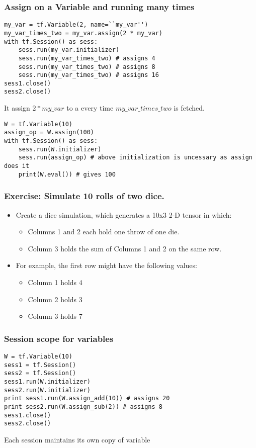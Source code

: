\begin{frame}[fragile] \frametitle{Assign on a Variable and running many times}

\begin{lstlisting}
my_var = tf.Variable(2, name=``my_var'') 
my_var_times_two = my_var.assign(2 * my_var)
with tf.Session() as sess:
	sess.run(my_var.initializer)
	sess.run(my_var_times_two) # assigns 4
	sess.run(my_var_times_two) # assigns 8
	sess.run(my_var_times_two) # assigns 16
sess1.close()
sess2.close()
\end{lstlisting}

It assign $2 * my\_var$ to a every time $my\_var\_times\_two$ is fetched.


\begin{lstlisting}
W = tf.Variable(10)
assign_op = W.assign(100)
with tf.Session() as sess:
	sess.run(W.initializer)
	sess.run(assign_op) # above initialization is uncessary as assign does it
	print(W.eval()) # gives 100
\end{lstlisting}

\end{frame}

\begin{frame}[fragile] \frametitle{Exercise: Simulate 10 rolls of two dice.}
\begin{itemize}
\item Create a dice simulation, which generates a 10x3 2-D tensor in which:
\begin{itemize}
\item Columns 1 and 2 each hold one throw of one die.
\item Column 3 holds the sum of Columns 1 and 2 on the same row.
\end{itemize}
\item For example, the first row might have the following values:
\begin{itemize}
\item Column 1 holds 4
\item Column 2 holds 3
\item Column 3 holds 7
\end{itemize}
\end{itemize}
\end{frame}




\begin{frame}[fragile] \frametitle{Session scope for variables}

\begin{lstlisting}
W = tf.Variable(10)
sess1 = tf.Session()
sess2 = tf.Session()
sess1.run(W.initializer)
sess2.run(W.initializer)
print sess1.run(W.assign_add(10)) # assigns 20
print sess2.run(W.assign_sub(2)) # assigns 8
sess1.close()
sess2.close()
\end{lstlisting}

Each session maintains its own copy of variable
\end{frame}

